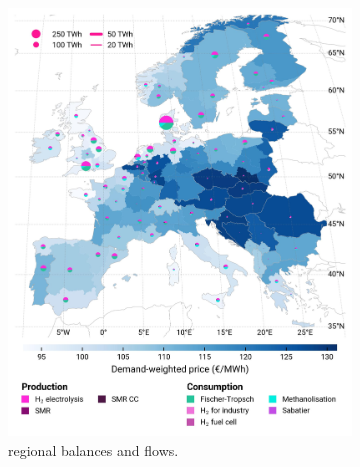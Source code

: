 \documentclass[final,5p,times,twocolumn,sort&compress]{elsarticle}
\begin{document}
\begin{figure}[htbp]
  \centering
  \begin{subfigure}[t]{0.49\textwidth}
      \vspace{0pt}
      \includegraphics[width=1\textwidth]{maps/no-pipelines-no-pcipmi/base_s_adm___2040-balance_map_H2}
      \vspace{-0.5cm}
      \caption{ regional balances and flows.}
      \label{fig:DI_lt_2040_h2}
  \end{subfigure}
  \hfill
  \begin{subfigure}[t]{0.49\textwidth}
      \vspace{0pt}

\end{subfigure}
\end{figure}
\end{document}
